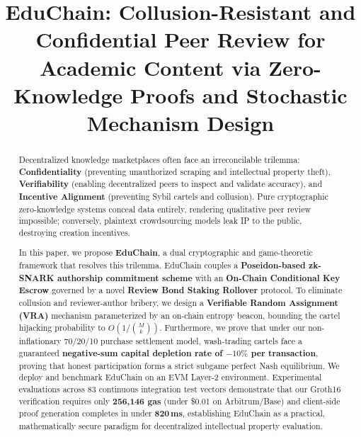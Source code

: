 \documentclass[conference,10pt]{IEEEtran}
\begin{document}
\title{EduChain: Collusion-Resistant and Confidential Peer Review for Academic Content via Zero-Knowledge Proofs and Stochastic Mechanism Design}

\author{
}

\maketitle

\begin{abstract}
Decentralized knowledge marketplaces often face an irreconcilable trilemma: \textbf{Confidentiality} (preventing unauthorized scraping and intellectual property theft), \textbf{Verifiability} (enabling decentralized peers to inspect and validate accuracy), and \textbf{Incentive Alignment} (preventing Sybil cartels and collusion). Pure cryptographic zero-knowledge systems conceal data entirely, rendering qualitative peer review impossible; conversely, plaintext crowdsourcing models leak IP to the public, destroying creation incentives. 

In this paper, we propose \textbf{EduChain}, a dual cryptographic and game-theoretic framework that resolves this trilemma. EduChain couples a \textbf{Poseidon-based zk-SNARK authorship commitment scheme} with an \textbf{On-Chain Conditional Key Escrow} governed by a novel \textbf{Review Bond Staking Rollover} protocol. To eliminate collusion and reviewer-author bribery, we design a \textbf{Verifiable Random Assignment (VRA)} mechanism parameterized by an on-chain entropy beacon, bounding the cartel hijacking probability to $O(1/\binom{M}{k})$. Furthermore, we prove that under our non-inflationary 70/20/10 purchase settlement model, wash-trading cartels face a guaranteed \textbf{negative-sum capital depletion rate of $-10\%$ per transaction}, proving that honest participation forms a strict subgame perfect Nash equilibrium. We deploy and benchmark EduChain on an EVM Layer-2 environment. Experimental evaluations across 83 continuous integration test vectors demonstrate that our Groth16 verification requires only \textbf{256,146 gas} (under \$0.01 on Arbitrum/Base) and client-side proof generation completes in under \textbf{820\,ms}, establishing EduChain as a practical, mathematically secure paradigm for decentralized intellectual property evaluation.
\end{abstract}
\end{document}
